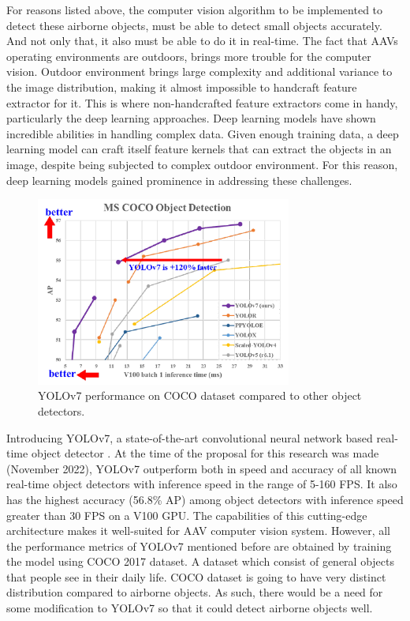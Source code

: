     For reasons listed above, the computer vision algorithm to be implemented to detect these airborne objects, 
    must be able to detect small objects accurately. And not only that, it also must be able to do it in real-time.
    The fact that AAVs operating environments are outdoors, brings more trouble for the computer
    vision. Outdoor environment brings large complexity and additional variance to the image distribution, 
    making it almost impossible to handcraft feature extractor for it. This is where non-handcrafted
    feature extractors come in handy, particularly the deep learning approaches. Deep learning models
    have shown incredible abilities in handling complex data. Given enough training data, a deep learning
    model can craft itself feature kernels that can extract the objects in an image, despite being subjected
    to complex outdoor environment. For this reason, deep learning models gained prominence in addressing
    these challenges. 
    \begin{figure} [H]
        \centering
        \includegraphics[width=0.75\textwidth]{figures/yolov7-coco.png}
        \caption{YOLOv7 performance on COCO dataset compared to other object detectors.}
        \label{fig:yolov7-coco}
    \end{figure}

    Introducing YOLOv7, a state-of-the-art convolutional neural network based real-time object detector \parencite{yolov7}.
    At the time of the proposal for this research was made (November 2022),
    YOLOv7 outperform both in speed and accuracy of all known real-time object detectors 
    with inference speed in the range of 5-160 FPS. It also has the highest accuracy (56.8\% AP) among
    object detectors with inference speed greater than 30 FPS on a V100 GPU. The capabilities of this cutting-edge architecture
    makes it well-suited for AAV computer vision system. However, all the performance metrics of YOLOv7
    mentioned before are obtained by training the model using COCO 2017 dataset. A dataset which 
    consist of general objects that people see in their daily life. COCO dataset is going to have
    very distinct distribution compared to airborne objects. As such, there would be a need for
    some modification to YOLOv7 so that it could detect airborne objects well.

